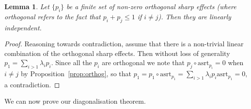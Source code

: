 \documentclass[a4paper,onecolumn,10pt,accepted=2019-05-03, issue=1, volume=1, shorttitle=papers/compositionality-1-1]{compositionalityarticle}
\DeclarePairedDelimiter{\ceil}{\lceil}{\rceil}
\newcounter{counter}
\numberwithin{counter}{section}
\newtheorem{proposition}[counter]{Proposition}
\newtheorem{definition}[counter]{Definition}
\newtheorem{lemma}[counter]{Lemma}
\newcommand{\asrt}{\text{asrt}}
\begin{document}



\begin{lemma}\label{lem:orthindep}
	Let $\{p_i\}$ be a finite set of non-zero orthogonal sharp effects (where orthogonal refers to the fact that $p_i+p_j\leq 1$ if $i\neq j$). Then they are linearly independent.
\end{lemma}
\begin{proof}
	Reasoning towards contradiction, assume that there is a non-trivial linear combination of the orthogonal sharp effects. Then without loss of generality $p_1 = \sum_{i>1} \lambda_i p_i$. Since all the $p_i$ are orthogonal we note that $p_j\circ \asrt_{p_i} = 0$ when $i\neq j$ by Proposition~\ref{prop:orthog}, so that $p_1 = p_1\circ\asrt_{p_1} = \sum_{i>1}\lambda_i p_i\asrt_{p_1} = 0$, a contradiction.
\end{proof}

\noindent We can now prove our diagonalisation theorem.
\end{document}
